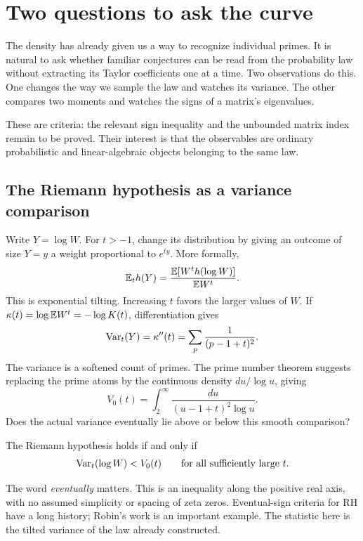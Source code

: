 \section{Two questions to ask the curve}\label{cq:section}

The density has already given us a way to recognize individual primes. It is
natural to ask whether familiar conjectures can be read from the probability
law without extracting its Taylor coefficients one at a time. Two observations
do this. One changes the way we sample the law and watches its variance. The
other compares two moments and watches the signs of a matrix's eigenvalues.

These are criteria: the relevant sign inequality and the unbounded matrix
index remain to be proved. Their interest is that the observables are ordinary
probabilistic and linear-algebraic objects belonging to the same law.

\subsection{The Riemann hypothesis as a variance comparison}

Write \(Y=\log W\). For \(t>-1\), change its distribution by giving an outcome
of size \(Y=y\) a weight proportional to \(e^{ty}\). More formally,
\[
 \mathbb E_t h(Y)=\frac{\mathbb E[W^t h(\log W)]}{\mathbb E W^t}.
\]
This is exponential tilting. Increasing \(t\) favors the larger values of
\(W\). If \(\kappa(t)=\log \mathbb E W^t=-\log K(t)\), differentiation gives
\begin{equation}\label{cq:variance}
 \operatorname{Var}_t(Y)=\kappa''(t)=\sum_p\frac{1}{(p-1+t)^2}.
\end{equation}
The variance is a softened count of primes. The prime number theorem suggests
replacing the prime atoms by the continuous density \(du/\log u\), giving
\[
 V_0(t)=\int_2^\infty\frac{du}{(u-1+t)^2\log u}.
\]
Does the actual variance eventually lie above or below this smooth comparison?

\begin{theorem}\label{cq:rhvariance}
The Riemann hypothesis holds if and only if
\[
             \operatorname{Var}_t(\log W)<V_0(t)
             \qquad\text{for all sufficiently large }t.
\]
\end{theorem}

The word \emph{eventually} matters. This is an inequality along the positive
real axis, with no assumed simplicity or spacing of zeta zeros. Eventual-sign
criteria for RH have a long history; Robin's work \cite{Robin1984} is an
important example. The statistic here is the tilted variance of the law
already constructed.


